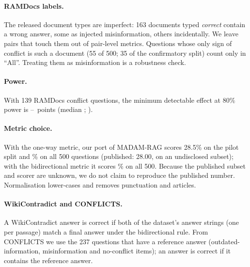 \paragraph{RAMDocs labels.} The released document types are imperfect: 163 documents typed \emph{correct} contain a
wrong answer, some as injected misinformation, others incidentally. We leave pairs that touch them out of pair-level
metrics. Questions whose only sign of conflict is such a document (55 of 500; 35 of the confirmatory split) count
only in ``All''. Treating them as misinformation is a robustness check.

\paragraph{Power.} With 139 RAMDocs conflict questions, the minimum detectable effect at 80\% power is
\mdeLo--\mdeHi\ points (median \mdeMed; \citealp{card2020power}).

\paragraph{Metric choice.} With the one-way metric, our port of MADAM-RAG scores 28.5\% on the pilot split and
\madamOneWay\% on all 500 questions (published: 28.00, on an undisclosed subset); with the bidirectional metric it
scores \madamBidir\% on all 500. Because the published subset and scorer are unknown, we do not claim to reproduce the
published number. Normalisation lower-cases and removes punctuation and articles.

\paragraph{WikiContradict and CONFLICTS.} A WikiContradict answer is correct if both of the dataset's answer strings
(one per passage) match a final answer under the bidirectional rule. From CONFLICTS we use the 237 questions that
have a reference answer (outdated-information, misinformation and no-conflict items); an answer is correct if it
contains the reference answer.

